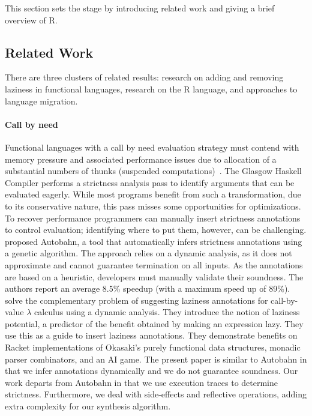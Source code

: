 \documentclass[review,nonacm,screen,acmsmall,anonymous=true]{acmart}
\begin{document}
This section sets the stage by introducing related work and giving a brief
overview of R.

\subsection{Related Work}

There are three clusters of related results: research on adding and removing
laziness in functional languages, research on the R language, and approaches to
language migration.

\paragraph{Call by need}  Functional languages with
a call by need evaluation strategy must contend with memory pressure and
associated performance issues due to allocation of a substantial numbers of thunks
(suspended computations)~\cite{transformopt,stricteffective,opteval}. The
Glasgow Haskell Compiler performs a strictness analysis pass to identify
arguments that can be evaluated eagerly. While most programs benefit from such a
transformation, due to its conservative nature, this pass misses some opportunities
for optimizations. To recover performance programmers can manually insert
strictness annotations to control evaluation; identifying where to put them, however,
can be challenging. \citet{autobahn} proposed Autobahn, a tool that
automatically infers strictness annotations using a genetic algorithm. The
approach relies on a dynamic analysis, as it does not approximate and cannot
guarantee termination on all inputs. As the annotations are based on a
heuristic, developers must manually validate their soundness. The authors report
an average 8.5\% speedup (with a maximum speed up of 89\%). \citet{lazyprof}
solve the complementary problem of suggesting laziness annotations for
call-by-value $\lambda$ calculus using a dynamic analysis. They introduce the
notion of laziness potential, a predictor of the benefit obtained by making an
expression lazy. They use this as a guide to insert laziness annotations. They
demonstrate benefits on Racket implementations of Okasaki's purely functional
data structures, monadic parser combinators, and an AI game. The present paper
is similar to Autobahn in that we infer annotations dynamically and we do not
guarantee soundness. Our work departs from Autobahn in that we use
execution traces to determine strictness. Furthermore, we deal with
side-effects and reflective operations, adding extra complexity for our
synthesis algorithm.
\end{document}
